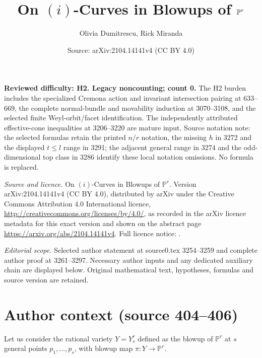 \documentclass[10pt,a4paper]{amsart}
\title[On $(i)$-Curves in Blowups]{On $(i)$-Curves in Blowups of $\bbP^r$}
\author{Olivia Dumitrescu, Rick Miranda}
\date{Source: arXiv:2104.14141v4 (CC BY 4.0)}
\def\bbP{\mathbb{P}}
\begin{document}
\maketitle
\noindent\textbf{Reviewed difficulty: H2. Legacy noncounting; count 0.} The H2 burden includes the specialized Cremona action and invariant intersection pairing at 633--669, the complete normal-bundle and movability induction at 3070--3108, and the selected finite Weyl-orbit/facet identification. The independently attributed effective-cone inequalities at 3206--3220 are mature input. Source notation note: the selected formulas retain the printed $n/r$ notation, the missing $h$ in 3272 and the displayed $t\leq l$ range in 3291; the adjacent general range in 3274 and the odd-dimensional top class in 3286 identify these local notation omissions. No formula is replaced.\par\medskip

\noindent\emph{Source and licence.} On $(i)$-Curves in Blowups of $\bbP^r$. Version arXiv:2104.14141v4 (CC BY 4.0), distributed by arXiv under the Creative Commons Attribution 4.0 International licence, \url{http://creativecommons.org/licenses/by/4.0/}, as recorded in the arXiv licence metadata for this exact version and shown on the abstract page \url{https://arxiv.org/abs/2104.14141v4}. Full licence notice: .\par\smallskip


\noindent\textit{Editorial scope.} Selected author statement at source0.tex 3254--3259 and complete author proof at 3261--3297. Necessary author inputs and any dedicated auxiliary chain are displayed below. Original mathematical text, hypotheses, formulas and source version are retained.\par\smallskip
\section*{Author context (source 404--406)}
Let us consider the rational variety $Y=Y_s^r$
defined as the blowup of $\bbP^r$ at $s$ general points $p_1,\ldots,p_s$,
with blowup map $\pi:Y \to \bbP^r$.
\end{document}
